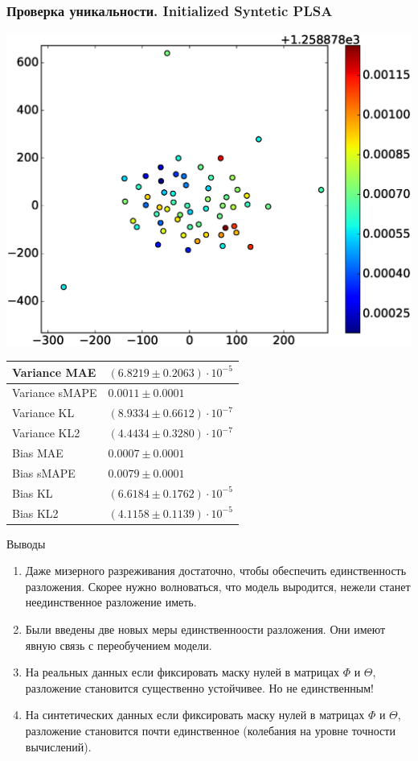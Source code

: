 \documentclass[utf8]{beamer}
\begin{document}
	
	\begin{frame}	
	\fontsize{8pt}{15.0}\selectfont
	\frametitle{Проверка уникальности. Initialized Syntetic PLSA}
	 \includegraphics[width=0.45\linewidth]{presentation_pictures/full_initialized_syntetic_plsa.eps} 
    \begin{tabular}[b]{| l | l | }\hline
      Variance MAE & $(6.8219 \pm 0.2063)  \cdot10^{-5}$ \\ \hline
      Variance sMAPE  & $0.0011 \pm 0.0001$ \\ \hline
      Variance KL  & $(8.9334 \pm 0.6612)  \cdot10^{-7}$ \\ \hline
      Variance KL2  & $(4.4434 \pm 0.3280)  \cdot10^{-7}$ \\ \hline

      Bias MAE & $0.0007 \pm 0.0001$ \\ \hline
      Bias sMAPE  & $0.0079 \pm 0.0001$ \\ \hline
      Bias KL  & $(6.6184 \pm 0.1762)  \cdot10^{-5}$ \\ \hline
      Bias KL2  & $(4.1158 \pm 0.1139)  \cdot10^{-5}$ \\ \hline
    \end{tabular}

	\end{frame}
	
	

\begin{frame}{Выводы}
\begin{enumerate}
\item Даже мизерного разреживания достаточно, чтобы обеспечить единственность разложения. Скорее нужно волноваться, что модель выродится, нежели станет неединственное разложение иметь.
\item Были введены две новых меры единственноости разложения. Они имеют явную связь с переобучением модели.
\item На реальных данных если фиксировать маску нулей в матрицах $\Phi$ и $\Theta$, разложение становится существенно устойчивее. Но не единственным!
\item На синтетических данных если фиксировать маску нулей в матрицах $\Phi$ и $\Theta$, разложение становится  почти единственное (колебания на уровне точности вычислений).
\end{enumerate}
\end{frame}
\end{document}

